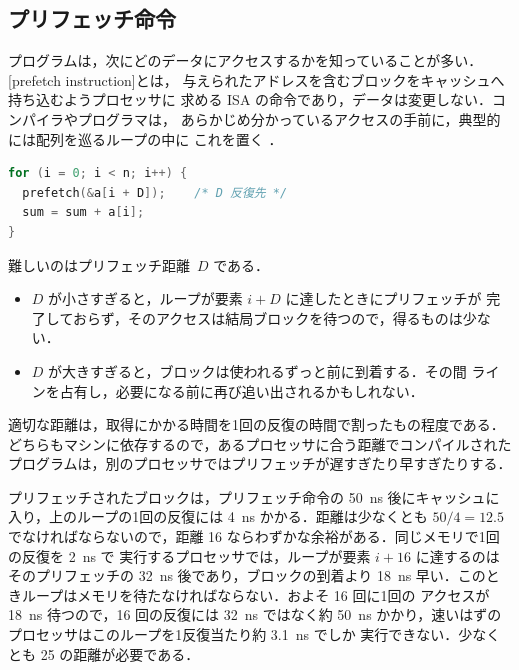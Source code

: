\documentclass[../main.tex]{subfiles}
\begin{document}
\subsection{プリフェッチ命令}

プログラムは，次にどのデータにアクセスするかを知っていることが多い．
[prefetch instruction]とは，
与えられたアドレスを含むブロックをキャッシュへ持ち込むようプロセッサに
求める ISA の命令であり，データは変更しない．コンパイラやプログラマは，
あらかじめ分かっているアクセスの手前に，典型的には配列を巡るループの中に
これを置く \cite{callahan1991}．
\begin{lstlisting}[language=C, numbers=none]
for (i = 0; i < n; i++) {
  prefetch(&a[i + D]);    /* D 反復先 */
  sum = sum + a[i];
}
\end{lstlisting}
難しいのはプリフェッチ距離~$D$ である．
\begin{itemize}
  \item $D$ が小さすぎると，ループが要素 $i+D$ に達したときにプリフェッチが
    完了しておらず，そのアクセスは結局ブロックを待つので，得るものは少ない．
  \item $D$ が大きすぎると，ブロックは使われるずっと前に到着する．その間
    ラインを占有し，必要になる前に再び追い出されるかもしれない．
\end{itemize}
適切な距離は，取得にかかる時間を1回の反復の時間で割ったもの程度である．
どちらもマシンに依存するので，あるプロセッサに合う距離でコンパイルされた
プログラムは，別のプロセッサではプリフェッチが遅すぎたり早すぎたりする．

\begin{example}
  \label{ex:l14-prefetch-distance}
  プリフェッチされたブロックは，プリフェッチ命令の \SI{50}{\nano\second}
  後にキャッシュに入り，上のループの1回の反復には \SI{4}{\nano\second}
  かかる．距離は少なくとも $50/4 = 12.5$ でなければならないので，距離 16
  ならわずかな余裕がある．同じメモリで1回の反復を \SI{2}{\nano\second} で
  実行するプロセッサでは，ループが要素 $i+16$ に達するのはそのプリフェッチの
  \SI{32}{\nano\second} 後であり，ブロックの到着より \SI{18}{\nano\second}
  早い．このときループはメモリを待たなければならない．およそ 16 回に1回の
  アクセスが \SI{18}{\nano\second} 待つので，16 回の反復には
  \SI{32}{\nano\second} ではなく約 \SI{50}{\nano\second} かかり，速いはずの
  プロセッサはこのループを1反復当たり約 \SI{3.1}{\nano\second} でしか
  実行できない．少なくとも 25 の距離が必要である．
\end{example}
\end{document}
